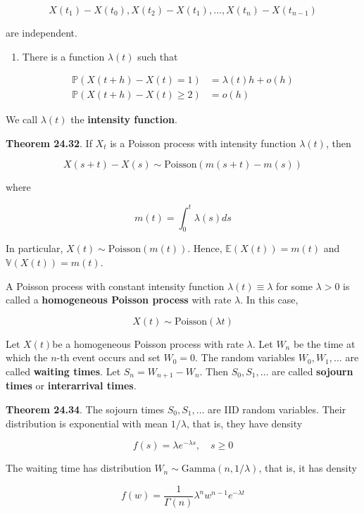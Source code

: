 \[ X(t_{1}) - X(t_{0}), X(t_{2}) - X(t_{1}), \dots, X(t_{n}) - X(t_{n - 1})\]

are independent.

\begin{enumerate}[tightlist,label={\arabic*.},resume]
\item
  There is a function \(\lambda(t)\) such that
\end{enumerate}

\begin{align*}
\mathbb{P}\left(X(t + h) - X(t) = 1\right) &= \lambda(t)h + o(h) \\
\mathbb{P}\left(X(t + h) - X(t) \geq 2\right) &= o(h)
\end{align*}

We call \(\lambda(t)\) the \textbf{intensity function}.

\textbf{Theorem 24.32}. If \(X_t\) is a Poisson process with intensity
function \(\lambda(t)\), then

\[ X(s + t) - X(s) \sim \text{Poisson}\left( m(s + t) - m(s) \right) \]

where

\[ m(t) = \int_{0}^t \lambda(s) ds \]

In particular, \(X(t) \sim \text{Poisson}(m(t))\). Hence,
\(\mathbb{E}(X(t)) = m(t)\) and \(\mathbb{V}(X(t)) = m(t)\).

A Poisson process with constant intensity function
\(\lambda(t) \equiv \lambda\) for some \(\lambda > 0\) is called a
\textbf{homogeneous Poisson process} with rate \(\lambda\). In this
case,

\[ X(t) \sim \text{Poisson}(\lambda t) \]

Let \(X(t)\)be a homogeneous Poisson process with rate \(\lambda\). Let
\(W_{n}\) be the time at which the \(n\)-th event occurs and set
\(W_{0} = 0\). The random variables \(W_{0}, W_{1}, \dots\) are called
\textbf{waiting times}. Let \(S_{n} = W_{n + 1} - W_{n}\). Then
\(S_{0}, S_{1}, \dots\) are called \textbf{sojourn times} or
\textbf{interarrival times}.

\textbf{Theorem 24.34}. The sojourn times \(S_{0}, S_{1}, \dots\) are IID
random variables. Their distribution is exponential with mean
\(1 / \lambda\), that is, they have density

\[ f(s) = \lambda e^{-\lambda s}, \quad s \geq 0 \]

The waiting time has distribution
\(W_{n} \sim \text{Gamma}(n, 1 / \lambda)\), that is, it has density

\[ f(w) = \frac{1}{\Gamma(n)} \lambda^{n} w^{n - 1}e^{-\lambda t} \]

